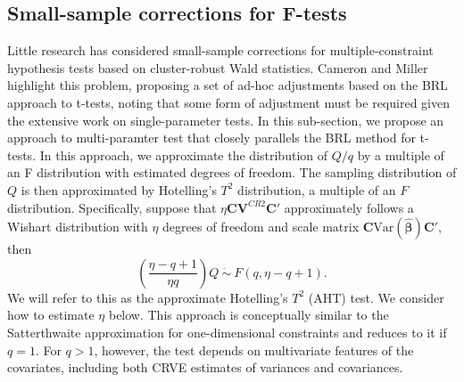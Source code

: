 \documentclass[12pt]{article}\usepackage[]{graphicx}\usepackage[]{color}
\newcommand{\Var}{\text{Var}}
\newcommand{\bm}{\mathbf}
\newcommand{\bs}{\boldsymbol}
\begin{document}

\subsection{Small-sample corrections for F-tests}

Little research has considered small-sample corrections for multiple-constraint hypothesis tests based on cluster-robust Wald statistics.
Cameron and Miller highlight this problem, proposing a set of ad-hoc adjustments based on the BRL approach to t-tests, noting that some form of adjustment must be required given the extensive work on single-parameter tests.
In this sub-section, we propose an approach to multi-paramter test that closely parallels the BRL method for t-tests.
In this approach, we approximate the distribution of $Q / q$ by a multiple of an F distribution with estimated degrees of freedom. 
The sampling distribution of $Q$ is then approximated by Hotelling's $T^2$ distribution, a multiple of an $F$ distribution. 
Specifically, suppose that $\eta \bm{C}\bm{V}^{CR2} \bm{C}'$ approximately follows a Wishart distribution with $\eta$ degrees of freedom and scale matrix $\bm{C} \Var\left(\bs{\hat\beta}\right)\bm{C}'$, then 
\begin{equation}
\label{eq:AHT}
\left(\frac{\eta - q + 1}{\eta q}\right) Q \ \dot\sim \ F(q, \eta - q + 1).
\end{equation}
We will refer to this as the approximate Hotelling's $T^2$ (AHT) test.
We consider how to estimate $\eta$ below.
This approach is conceptually similar to the Satterthwaite approximation for one-dimensional constraints and reduces to it if $q = 1$. 
For $q > 1$, however, the test depends on multivariate features of the covariates, including both CRVE estimates of variances and covariances. 
\end{document}
